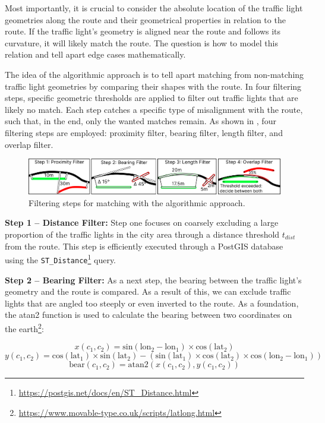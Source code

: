 Most importantly, it is crucial to consider the absolute location of the traffic light geometries along the route and their geometrical properties in relation to the route. If the traffic light's geometry is aligned near the route and follows its curvature, it will likely match the route. The question is how to model this relation and tell apart edge cases mathematically.

The idea of the algorithmic approach is to tell apart matching from non-matching traffic light geometries by comparing their shapes with the route. In four filtering steps, specific geometric thresholds are applied to filter out traffic lights that are likely no match. Each step catches a specific type of misalignment with the route, such that, in the end, only the wanted matches remain. As shown in , four filtering steps are employed: proximity filter, bearing filter, length filter, and overlap filter.

\begin{figure}[t]
\centering
\includegraphics[width=\linewidth]{images/sg-matching-filters.pdf}
\caption{Filtering steps for matching with the algorithmic approach.}
\label{fig:sg-matching-filters}
\end{figure}

\textbf{\color{cidarkblue}Step 1 -- Distance Filter:} Step one focuses on coarsely excluding a large proportion of the traffic lights in the city area through a distance threshold $t_{dist}$ from the route. This step is efficiently executed through a PostGIS database using the \texttt{ST\_Distance}\footnote{\url{https://postgis.net/docs/en/ST\_Distance.html}} query.

\textbf{\color{cidarkblue}Step 2 -- Bearing Filter:} As a next step, the bearing between the traffic light's geometry and the route is compared. As a result of this, we can exclude traffic lights that are angled too steeply or even inverted to the route. As a foundation, the atan2 function is used to calculate the bearing between two coordinates on the earth\footnote{\url{https://www.movable-type.co.uk/scripts/latlong.html}}:

\begin{equation}
x(c_1, c_2) = \text{sin}(\text{lon}_2 - \text{lon}_1) \times \text{cos}(\text{lat}_2)
\end{equation}
\begin{equation}
y(c_1, c_2) = \text{cos}(\text{lat}_1) \times \text{sin}(\text{lat}_2) - (\text{sin}(\text{lat}_1) \times \text{cos}(\text{lat}_2) \times \text{cos}(\text{lon}_2 - \text{lon}_1))
\end{equation}
\begin{equation}
\text{bear}(c_1, c_2) = \text{atan2}(x(c_1, c_2), y(c_1, c_2))
\end{equation}


